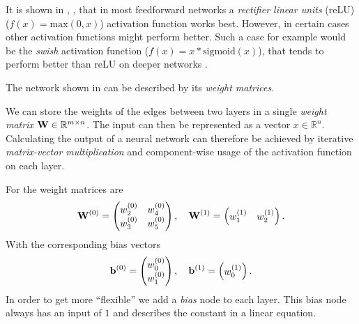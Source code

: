 It is shown in  \cite{Nair-Hinton}, \cite{inproceedings}, that in most feedforward networks a \emph{rectifier linear units} (reLU) (\(f(x) = \text{max}(0, x)\)) activation function works best.
However, in certain cases other activation functions might perform better.
Such a case for example would be the \emph{swish} activation function (\(f(x) = x * \text{sigmoid}(x)\)), that tends to perform better than reLU on deeper networks \cite{DBLP:journals/corr/abs-1710-05941}.



The network shown in  can be described by its \emph{weight matrices}.

We can store the weights of the edges between two layers in a single \emph{weight matrix} \(\mathbf{W} \in \mathbb{R}^{m \times n}\).
The input can then be represented as a vector \({x \in \mathbb{R}^n}\).
Calculating the output of a neural network can therefore be achieved by iterative \emph{matrix-vector multiplication} and component-wise usage of the activation function on each layer.

For  the weight matrices are
\begin{equation}
    \mathbf{W}^{(0)} =
    \begin{pmatrix}
        w_{2}^{(0)} & w_{4}^{(0)} \\
        w_{3}^{(0)} & w_{5}^{(0)}
    \end{pmatrix}, \quad
    \mathbf{W}^{(1)} = 
    \begin{pmatrix}
        w_{1}^{(1)} & w_{2}^{(1)}
    \end{pmatrix}.
\end{equation}
With the corresponding bias vectors
\begin{equation}
    \mathbf{b}^{(0)} =
    \begin{pmatrix}
        w_{0}^{(0)} \\
        w_{1}^{(0)}
    \end{pmatrix}, \quad
    \mathbf{b}^{(1)} =
    \begin{pmatrix}
        w_{0}^{(1)}
    \end{pmatrix}.
\end{equation}
In order to get more \enquote{flexible} we add a \emph{bias} node to each layer.
This bias node always has an input of \(1\) and describes the constant in a linear equation.

